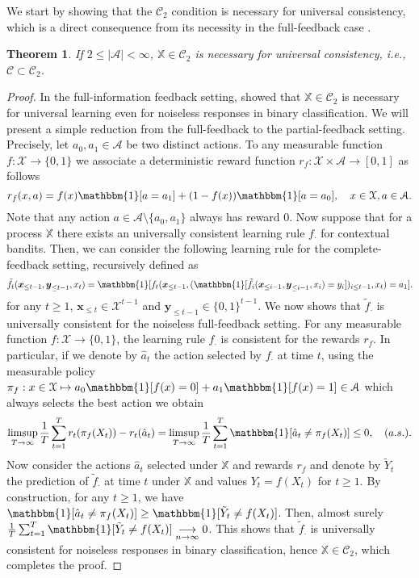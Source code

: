 \documentclass[aos]{imsart}
\theoremstyle{plain}
\newtheorem{theorem}{Theorem}[section]
\theoremstyle{remark}
\newcommand{\Acal}{\mathcal{A}}
\newcommand{\Ccal}{\mathcal{C}}
\newcommand{\Xcal}{\mathcal{X}}
\newcommand{\Xbb}{\mathbb{X}}
\newcommand{\1}{\mathbbm{1}}%
\newcommand{\mb}[1]{\ensuremath{\boldsymbol{#1}}}
\newcommand{\A}{\mathcal A}
\renewcommand{\limsup}{\mathop{\rm limsup}}
\newcommand{\ProcX}{\mathbb{X}}
\newcommand{\OKC}{\mathcal{C}_{2}}
\newcommand{\SMV}{\OKC}
\begin{document}
We start by showing that the $\Ccal_2$ condition is necessary for universal consistency, which is a direct consequence from its necessity in the full-feedback case \cite{hanneke:21}.

\begin{theorem}
\label{thm:SMV-finite-nec}
If $2 \leq |\A| < \infty$, 
$\ProcX \in \SMV$ is necessary 
for universal consistency, i.e., $\Ccal \subset \Ccal_2$.
\end{theorem}

\begin{proof}
In the full-information feedback setting, \citep*[Theorem 37]{hanneke:21} showed that $\Xbb\in\Ccal_2$ is necessary for universal learning even for noiseless responses in binary classification. We will present a simple reduction from the full-feedback to the partial-feedback setting. Precisely, let $a_0,a_1\in\Acal$ be two distinct actions. To any measurable function $f:\Xcal\to \{0,1\}$ we associate a deterministic reward function $r_f:\Xcal\times \Acal \to [0,1]$ as follows
\begin{equation*}
    r_f(x,a) = f(x)\1[a=a_1] + (1-f(x))\1[a=a_0],\quad x\in\Xcal,a\in\Acal.
\end{equation*}
Note that any action $a\in\Acal\setminus\{a_0,a_1\}$ always has reward $0$. Now suppose that for a process $\Xbb$ there exists an universally consistent learning rule $f_\cdot$ for contextual bandits. Then, we can consider the following learning rule for the complete-feedback setting, recursively defined as
\begin{equation*}
    \tilde f_t(\mb x_{\leq t-1},\mb y_{\leq t-1},x_t) = \1[f_t(\mb x_{\leq t-1},(\1[\tilde f_i(\mb x_{\leq i-1},\mb y_{\leq i-1},x_i) =y_i])_{i\leq t-1},x_t) = a_1].
\end{equation*}
for any $t\geq 1$, $\mb x_{\leq t}\in\Xcal^{t-1}$ and $\mb y_{\leq t-1}\in\{0,1\}^{t-1}$. We now shows that $\tilde f_\cdot$ is universally consistent for the noiseless full-feedback setting. For any measurable function $f:\Xcal\to\{0,1\}$, the learning rule $f_\cdot$ is consistent for the rewards $r_f$. In particular, if we denote by $\hat a_t$ the action selected by $f_\cdot$ at time $t$, using the measurable policy $\pi_f:x\in\Xcal\mapsto a_0\1[f(x)=0] + a_1\1[f(x)=1] \in\Acal$ which always selects the best action we obtain
\begin{equation*}
    \limsup_{T\to\infty}\frac{1}{T}\sum_{t=1}^T r_t(\pi_f(X_t))-r_t(\hat a_t) = \limsup_{T\to\infty} \frac{1}{T}\sum_{t=1}^T \1[\hat a_t \neq  \pi_f(X_t)] \leq 0,\quad (a.s.).
\end{equation*}
Now consider the actions $\hat a_t$ selected under $\Xbb$ and rewards $r_f$ and denote by $\tilde Y_t$ the prediction of $\tilde f_\cdot$ at time $t$ under $\Xbb$ and values $Y_t = f(X_t)$ for $t\geq 1$. By construction, for any $t\geq 1$, we have $\1[\hat a_t \neq \pi_f(X_t)] \geq  \1[\tilde Y_t \neq f(X_t)]$. Then, almost surely $\frac{1}{T}\sum_{t=1}^T \1[\tilde Y_t\neq f(X_t)] \underset{n\to\infty}{\longrightarrow} 0$. This shows that $\tilde f_\cdot$ is universally consistent for noiseless responses in binary classification, hence $\Xbb\in\Ccal_2$, which completes the proof. 
\end{proof}
\end{document}
